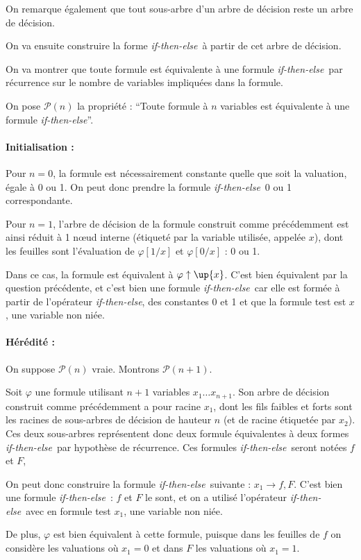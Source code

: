 \documentclass[12pt]{article}
\def\phix{\varphi\uparrow\up{x}}
\def\ite{\textit{if-then-else}}
\def\P{\mathcal{P}}
\begin{document}
On remarque également que tout sous-arbre d'un arbre de décision reste un arbre de décision. %

On va ensuite construire la forme \ite\ à partir de cet arbre de décision.

On va montrer que toute formule est équivalente à une formule \ite\ par récurrence sur le nombre de variables impliquées dans la formule.

On pose $\P(n)$ la propriété : ``Toute formule à $n$ variables est équivalente à une formule \ite''.

\paragraph{Initialisation : }
Pour $n=0$, la formule est nécessairement constante quelle que soit la valuation, égale à 0 ou 1. On peut donc prendre la formule \ite\ 0 ou 1 correspondante.

Pour $n=1$, l'arbre de décision de la formule construit comme précédemment est ainsi réduit à 1 n\oe ud interne (étiqueté par la variable utilisée, appelée $x$), dont les feuilles sont l'évaluation de $\varphi [ 1/x ]$ et $\varphi [ 0/x ]$ : 0 ou 1.

Dans ce cas, la formule est équivalent à $\phix$. C'est bien équivalent par la question précédente, et c'est bien une formule \ite\ car elle est formée à partir de l'opérateur \ite, des constantes 0 et 1 et que la formule test est $x$, une variable non niée.

\paragraph{Hérédité : }
On suppose $\P (n)$ vraie. Montrons $\P (n+1)$.

Soit $\varphi$ une formule utilisant $n+1$ variables $x_1\dots x_{n+1}$. Son arbre de décision construit comme précédemment a pour racine $x_1$, dont les fils faibles et forts sont les racines de sous-arbres de décision de hauteur $n$ (et de racine étiquetée par $x_2$). Ces deux sous-arbres représentent donc deux formule équivalentes à deux formes \ite\ par hypothèse de récurrence. Ces formules \ite\ seront notées $f$ et $F$,

On peut donc construire la formule \ite\ suivante : $x_1\rightarrow f,F$. C'est bien une formule \ite\ : $f$ et $F$ le sont, et on a utilisé l'opérateur \ite\ avec en formule test $x_1$, une variable non niée.

De plus, $\varphi$ est bien équivalent à cette formule, puisque dans les feuilles de $f$ on considère les valuations où $x_1 = 0$ et dans $F$ les valuations où $x_1 = 1$.
\end{document}
